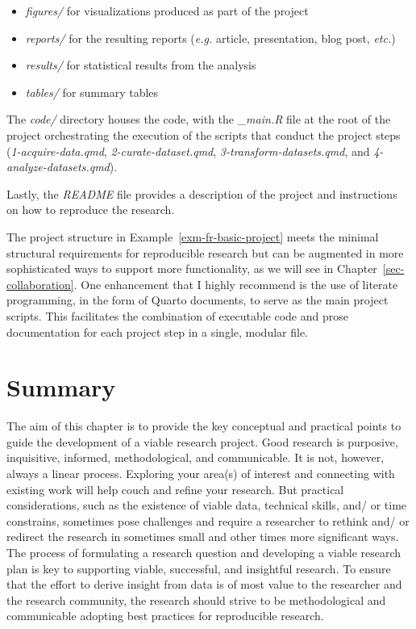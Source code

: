 \documentclass[
  letterpaper,
  DIV=11,
  numbers=noendperiod]{scrreport}
\providecommand{\tightlist}{%
  \setlength{\itemsep}{0pt}\setlength{\parskip}{0pt}}\usepackage{longtable,booktabs,array}
\theoremstyle{definition}
\theoremstyle{remark}
\begin{document}
\begin{itemize}
\tightlist
\item
  \emph{figures/} for visualizations produced as part of the project
\item
  \emph{reports/} for the resulting reports (\emph{e.g.} article,
  presentation, blog post, \emph{etc.})
\item
  \emph{results/} for statistical results from the analysis
\item
  \emph{tables/} for summary tables
\end{itemize}

The \emph{code/} directory houses the code, with the \emph{\_main.R}
file at the root of the project orchestrating the execution of the
scripts that conduct the project steps (\emph{1-acquire-data.qmd},
\emph{2-curate-dataset.qmd}, \emph{3-transform-datasets.qmd}, and
\emph{4-analyze-datasets.qmd}).

Lastly, the \emph{README} file provides a description of the project and
instructions on how to reproduce the research.

The project structure in Example~\ref{exm-fr-basic-project} meets the
minimal structural requirements for reproducible research but can be
augmented in more sophisticated ways to support more functionality, as
we will see in Chapter~\ref{sec-collaboration}. One enhancement that I
highly recommend is the use of literate programming, in the form of
Quarto documents, to serve as the main project scripts. This facilitates
the combination of executable code and prose documentation for each
project step in a single, modular file.

\hypertarget{summary-3}{%
\section*{Summary}\label{summary-3}}


The aim of this chapter is to provide the key conceptual and practical
points to guide the development of a viable research project. Good
research is purposive, inquisitive, informed, methodological, and
communicable. It is not, however, always a linear process. Exploring
your area(s) of interest and connecting with existing work will help
couch and refine your research. But practical considerations, such as
the existence of viable data, technical skills, and/ or time constrains,
sometimes pose challenges and require a researcher to rethink and/ or
redirect the research in sometimes small and other times more
significant ways. The process of formulating a research question and
developing a viable research plan is key to supporting viable,
successful, and insightful research. To ensure that the effort to derive
insight from data is of most value to the researcher and the research
community, the research should strive to be methodological and
communicable adopting best practices for reproducible research.
\end{document}
